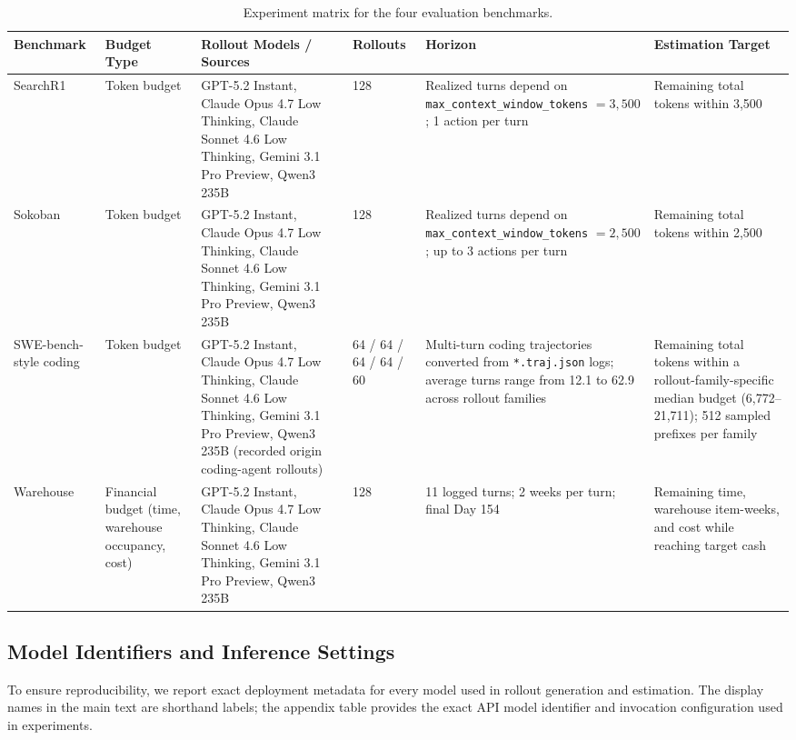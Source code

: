 \begin{table}[t]
\centering
\small
\setlength{\tabcolsep}{2pt}
\renewcommand{\arraystretch}{1.1}
\begin{tabular}{|p{}|p{}|p{}|p{}|p{}|p{}|}
\hline
Benchmark & Budget Type & Rollout Models / Sources & Rollouts & Horizon & Estimation Target \\
\hline
SearchR1 & Token budget & GPT-5.2 Instant, Claude Opus 4.7 Low Thinking, Claude Sonnet 4.6 Low Thinking, Gemini 3.1 Pro Preview, Qwen3 235B & 128 & Realized turns depend on \texttt{max\_context\_window\_tokens} $= 3{,}500$; 1 action per turn & Remaining total tokens within 3{,}500 \\
\hline
Sokoban & Token budget & GPT-5.2 Instant, Claude Opus 4.7 Low Thinking, Claude Sonnet 4.6 Low Thinking, Gemini 3.1 Pro Preview, Qwen3 235B & 128 & Realized turns depend on \texttt{max\_context\_window\_tokens} $= 2{,}500$; up to 3 actions per turn & Remaining total tokens within 2{,}500 \\
\hline
SWE-bench-style coding & Token budget & GPT-5.2 Instant, Claude Opus 4.7 Low Thinking, Claude Sonnet 4.6 Low Thinking, Gemini 3.1 Pro Preview, Qwen3 235B (recorded origin coding-agent rollouts) & 64 / 64 / 64 / 64 / 60 & Multi-turn coding trajectories converted from \texttt{*.traj.json} logs; average turns range from 12.1 to 62.9 across rollout families & Remaining total tokens within a rollout-family-specific median budget (6{,}772--21{,}711); 512 sampled prefixes per family \\
\hline
Warehouse & Financial budget (time, warehouse occupancy, cost) & GPT-5.2 Instant, Claude Opus 4.7 Low Thinking, Claude Sonnet 4.6 Low Thinking, Gemini 3.1 Pro Preview, Qwen3 235B & 128 & 11 logged turns; 2 weeks per turn; final Day 154 & Remaining time, warehouse item-weeks, and cost while reaching target cash \\
\hline
\end{tabular}
\caption{Experiment matrix for the four evaluation benchmarks.}
\label{tab:experiment-matrix}
\end{table}

\subsection{Model Identifiers and Inference Settings}
\label{sec:model-identifiers-and-inference-settings}

To ensure reproducibility, we report exact deployment metadata for every model used in rollout generation and estimation. The display names in the main text are shorthand labels; the appendix table provides the exact API model identifier and invocation configuration used in experiments.

